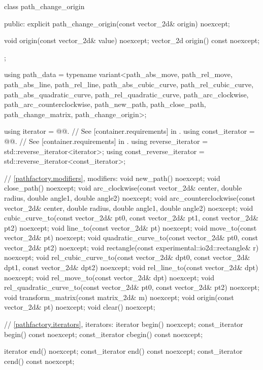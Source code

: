 \begin{codeblock}
{{{{{    class path_change_origin {
    public:
      explicit path_change_origin(const vector_2d& origin) noexcept;
      
      void origin(const vector_2d& value) noexcept;
      vector_2d origin() const noexcept;
    };
    
    using path_data      = typename variant<path_abs_move, path_rel_move,
      path_abs_line, path_rel_line, path_abs_cubic_curve, path_rel_cubic_curve, 
      path_abs_quadratic_curve, path_rel_quadratic_curve, path_arc_clockwise, 
      path_arc_counterclockwise, path_new_path, path_close_path, 
      path_change_matrix, path_change_origin>;
    
    using iterator       = @@. // See [container.requirements] in \cppseventeen.
    using const_iterator = @@. // See [container.requirements] in \cppseventeen.
    using reverse_iterator       = std::reverse_iterator<iterator>;
    using const_reverse_iterator = std::reverse_iterator<const_iterator>;
    
    // \ref{pathfactory.modifiers}, modifiers:
    void new_path() noexcept;
    void close_path() noexcept;
    void arc_clockwise(const vector_2d& center, double radius, double angle1,
      double angle2) noexcept;
    void arc_counterclockwise(const vector_2d& center, double radius,
      double angle1, double angle2) noexcept;
    void cubic_curve_to(const vector_2d& pt0, const vector_2d& pt1,
      const vector_2d& pt2) noexcept;
    void line_to(const vector_2d& pt) noexcept;
    void move_to(const vector_2d& pt) noexcept;
    void quadratic_curve_to(const vector_2d& pt0, const vector_2d& pt2)
      noexcept;
    void rectangle(const experimental::io2d::rectangle& r) noexcept;
    void rel_cubic_curve_to(const vector_2d& dpt0, const vector_2d& dpt1,
      const vector_2d& dpt2) noexcept;
    void rel_line_to(const vector_2d& dpt) noexcept;
    void rel_move_to(const vector_2d& dpt) noexcept;
    void rel_quadratic_curve_to(const vector_2d& pt0, const vector_2d& pt2)
      noexcept;
    void transform_matrix(const matrix_2d& m) noexcept;
    void origin(const vector_2d& pt) noexcept;
    void clear() noexcept;

    // \ref{pathfactory.iterators}, iterators:
    iterator begin() noexcept;
    const_iterator begin() const noexcept;
    const_iterator cbegin() const noexcept;

    iterator end() noexcept;
    const_iterator end() const noexcept;
    const_iterator cend() const noexcept;
    
}}}}}
\end{codeblock}
